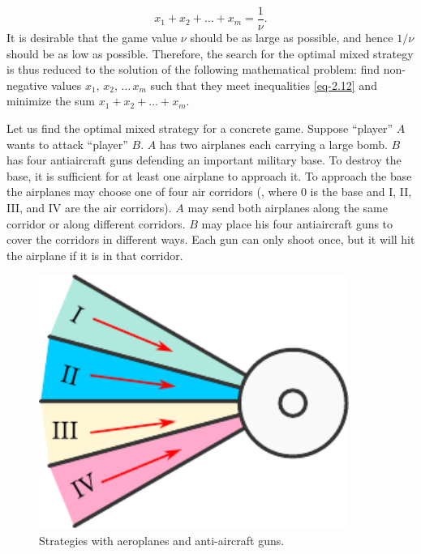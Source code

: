 \begin{equation}%
x_{1} + x_{2}+ \ldots + x_{m} = \frac{1}{\nu}. 
\label{eq-2.13}
\end{equation}
It is desirable that the game value $\nu$ should be as large as possible,
and hence $1/\nu$ should be as low as possible. Therefore, the search for the
optimal mixed strategy is thus reduced to the solution of the following
mathematical problem: find non-negative values $x_{1}, \, x_{2}, \, \ldots \, x_{m}$ such that they meet inequalities \eqref{eq-2.12} and minimize the sum $x_{1} + x_{2}+ \ldots{} + x_{m}$.

 Let us find the optimal mixed
strategy for a concrete game. Suppose ``player'' $A$ wants to attack
``player'' $B$. $A$ has two airplanes each carrying a large bomb. $B$ has four
antiaircraft guns defending an important military base. To destroy the
base, it is sufficient for at least one airplane to approach it. To approach
the base the airplanes may choose one of four air corridors (, where 0 is the base and I, II, III, and IV are the air corridors). $A$ may send both airplanes along the same corridor or along different corridors. $B$ may place his four antiaircraft guns to cover the corridors in different ways. Each gun can only shoot once, but it will hit the airplane if it is in that corridor.
 \begin{figure}%
 \centering
 \includegraphics[width=0.9\textwidth]{figures/anti-aircraft.pdf}
\caption{Strategies with aeroplanes and anti-aircraft guns.\label{anti-aircraft}}
 \end{figure}
 
